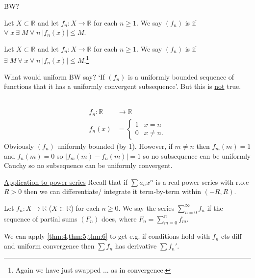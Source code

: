     BW?

    \begin{definition}
        Let $X \subset \mathbb{R}$ and let $f_n : X \to \mathbb{R}$ for each $n \geq 1$.
        We say $(f_n)$ is  if $\forall \; x \ \exists \; M \ \forall \; n \ |f_n(x)| \leq M$.
    \end{definition} 

    \begin{definition}
        Let $X \subset \mathbb{R}$ and let $f_n : X \to \mathbb{R}$ for each $n \geq 1$.
        We say $(f_n)$ is  if $\exists \; M \ \forall \; x \ \forall \; n \ |f_n(x)| \leq M$.\footnote{Again we have just swapped ... as in convergence.}
    \end{definition} 
    
    What would uniform BW say?
    `If $(f_n)$ is a uniformly bounded sequence of functions that it has a uniformly convergent subsequence'.
    But this is \underline{not} true.

    \begin{example}[Counterexample of BW] ~\vspace*{-1.5\baselineskip}
        \begin{align*}
            f_n : \mathbb{R} &\to \mathbb{R} \\
            f_n(x) &= \begin{cases}
                1 & x = n \\
                0 & x \neq n.
            \end{cases}
        \end{align*} 
        Obviously $(f_n)$ uniformly bounded (by 1).
        However, if $m \neq n$ then $f_m(m) = 1$ and $f_n(m) = 0$ so $|f_m(m) - f_n(m)| = 1$ so no subsequence can be uniformly Cauchy so no subsequence can be uniformly convergent.
    \end{example} 

    \underline{Application to power series}
    Recall that if $\sum a_n x^n$ is a real power series with r.o.c $R > 0$ then we can differentiate/ integrate it term-by-term within $(-R, R)$.

    \begin{definition}
        Let $f_n : X \to \mathbb{R}$ ($X \subset \mathbb{R}$) for each $n \geq 0$.
        We say the series $\sum_{n=0}^{\infty} f_n$  if the sequence of partial sums $(F_n)$ does, where $F_n = \sum_{m=0}^{n} f_m$.
    \end{definition} 
    We can apply \cref{thm:4,thm:5,thm:6} to get e.g. if conditions hold with $f_n$ cts diff and uniform convergence then $\sum f_n$ has derivative $\sum f_n'$.


